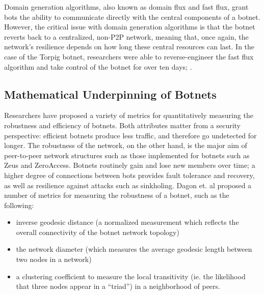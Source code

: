 \documentclass{acm_proc_article-sp}
\begin{document}
Domain generation algorithms, also known as domain flux and fast flux, grant bots the ability to communicate directly with the central components of a botnet.  However, the critical issue with domain generation algorithms is that the botnet reverts back to a centralized, non-P2P network, meaning that, once again, the network's resilience depends on how long these central resources can last.  In the case of the Torpig botnet, researchers were able to reverse-engineer the fast flux algorithm and take control of the botnet for over ten days; \cite{stone:takeover}.



%
%
%
%
\subsection{Mathematical Underpinning of Botnets}

Researchers have proposed a variety of metrics for quantitatively measuring the robustness and efficiency of botnets.  Both attributes matter from a security perspective: efficient botnets produce less traffic, and therefore go undetected for longer.  The robustness of the network, on the other hand, is the major aim of peer-to-peer network structures such as those implemented for botnets such as Zeus and ZeroAccess.  Botnets routinely gain and lose new members over time; a higher degree of connections between bots provides fault tolerance and recovery, as well as resilience against attacks such as sinkholing\cite{botnet:metrics}.  Dagon et. al proposed a number of metrics for measuring the robustness of a botnet, such as the following:

\begin{itemize}
\item inverse geodesic distance (a normalized measurement which reflects the overall connectivity of the botnet network topology)
\item the network diameter (which measures the average geodesic length between two nodes in a network)
\item a clustering coefficient to measure the local transitivity (ie. the likelihood that three nodes appear in a “triad”) in a neighborhood of peers.
\end{itemize}
\end{document}
